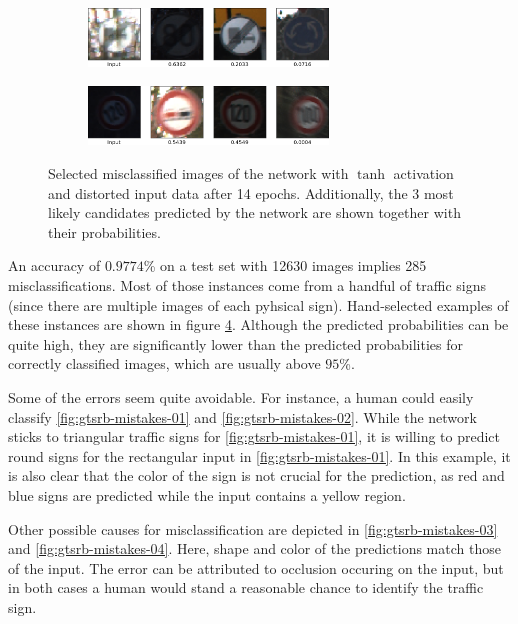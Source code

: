 \documentclass[11pt, a4paper]{article}
\begin{document}
\begin{figure}
\begin{subfigure}{\textwidth}
		\label{fig:gtsrb-mistakes-05}
	\end{subfigure}
	\begin{subfigure}{\textwidth}
		\centering
		\caption{}
		\includegraphics[width=0.7\textwidth]{gtsrb_mistakes/mistake_ueberholen_lkw.png}
		\label{fig:gtsrb-mistakes-06}
	\end{subfigure}
	\begin{subfigure}{\textwidth}
		\centering
		\caption{}
		\includegraphics[width=0.7\textwidth]{gtsrb_mistakes/mistake_limit_120.png}
		\label{fig:gtsrb-mistakes-07}
	\end{subfigure}
	\caption{Selected misclassified images of the network with $\tanh$ activation and distorted input data after 14 epochs. Additionally, the 3 most likely candidates predicted by the network are shown together with their probabilities.}
	\label{fig:gtsrb-mistakes}
\end{figure}

An accuracy of $0.9774$\% on a test set with 12630 images implies 285 misclassifications. Most of those instances come from a handful of traffic signs (since there are multiple images of each pyhsical sign). Hand-selected examples of these instances are shown in figure \ref{fig:gtsrb-mistakes}. Although the predicted probabilities can be quite high, they are significantly lower than the predicted probabilities for correctly classified images, which are usually above $95$\%.

Some of the errors seem quite avoidable. For instance, a human could easily classify \ref{fig:gtsrb-mistakes-01} and \ref{fig:gtsrb-mistakes-02}. While the network sticks to triangular traffic signs for \ref{fig:gtsrb-mistakes-01}, it is willing to predict round signs for the rectangular input in \ref{fig:gtsrb-mistakes-01}. In this example, it is also clear that the color of the sign is not crucial for the prediction, as red and blue signs are predicted while the input contains a yellow region.

Other possible causes for misclassification are depicted in \ref{fig:gtsrb-mistakes-03} and \ref{fig:gtsrb-mistakes-04}. Here, shape and color of the predictions match those of the input. The error can be attributed to occlusion occuring on the input, but in both cases a human would stand a reasonable chance to identify the traffic sign.
\end{document}
